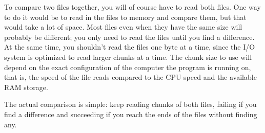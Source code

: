
To compare two files together, you will of course have to read both
files. One way to do it would be to read in the files to memory and
compare them, but that would take a lot of space. Most files even when
they have the same size will probably be different; you only need to
read the files until you find a difference. At the same time, you
shouldn't read the files one byte at a time, since the
I/O system is optimized to read larger chunks at a time. The chunk size
to use will depend on the exact configuration of the computer the
program is running on, that is, the speed of the file reads compared to
the CPU speed and the available RAM storage.

The actual comparison is simple: keep reading chunks of both files,
failing if you find a difference and succeeding if you reach the ends
of the files without finding any.


